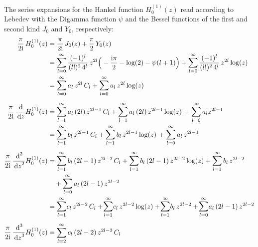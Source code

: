 \newpage
The series expansions for the Hankel function $H_0^{(1)}(z)$ read according to Lebedev \cite[Sec. 5.6]{lebedev} with the Digamma function $\psi$ and the Bessel functions of the first and second kind $J_0$ and $Y_0$, respectively:
\begin{align*}
  \frac{\pi}{2 \ii} \, H_0^{(1)}(z)
  &= \frac{\pi}{2\ii} \, J_0(z) + \frac{\pi}{2}\, Y_0(z) \\
  &= \mathlarger{\sum}_{l = 0}^\infty \, \frac{(-1)^l}{(l!)^2 \, 4^l} \,  z^{2l} \Big( -\frac{\ii \pi}{2} - \log(2) - \psi(l + 1) \Big) 
  +  \mathlarger{\sum}_{l = 0}^\infty \, \frac{(-1)^l}{(l!)^2 \, 4^l} \,  z^{2l} \log(z) \\
  &= \mathlarger{\sum}_{l = 0}^\infty \, a_l \,  z^{2l} \, C_l 
   + \mathlarger{\sum}_{l = 0}^\infty \, a_l  \,z^{2l} \log(z) \\[0.5em]
  \frac{\pi}{2\ii} \, \frac{\d{}}{\d z} H_0^{(1)}(z)
  &= \mathlarger{\sum}_{l = 1}^\infty \, a_l \,  (2l) \, z^{2l - 1} \, C_l 
  + \mathlarger{\sum}_{l = 1}^\infty \, a_l \, (2l)  \, z^{2l - 1} \log(z) \, 
  + \mathlarger{\sum}_{l = 0}^\infty \, a_l z^{2l - 1} \\
  &= \mathlarger{\sum}_{l = 1}^\infty \, b_l \, z^{2l - 1} \, C_l 
  + \mathlarger{\sum}_{l = 1}^\infty \, b_l \, z^{2l - 1} \log(z) \, 
  +  \mathlarger{\sum}_{l = 0}^\infty \, a_l \, z^{2l - 1} \\[0.5em]
  \frac{\pi}{2\ii} \, \frac{\d{}^2}{\d z^2} H_0^{(1)}(z)
  &= \mathlarger{\sum}_{l = 1}^\infty \, b_l \, (2l - 1) \, z^{2l - 2} \, C_l 
  + \mathlarger{\sum}_{l = 1}^\infty \, b_l \, (2l - 1)\, z^{2l - 2} \log(z) 
  + \mathlarger{\sum}_{l = 1}^\infty \, b_l \, z^{2l - 2}\\
  &\quad + \mathlarger{\sum}_{l = 0}^\infty \, a_l \, (2l - 1) \, z^{2l - 2} \\
  &=   \mathlarger{\sum}_{l = 1}^\infty c_l \, z^{2l - 2} \, C_l 
  +  \!\mathlarger{\sum}_{l = 1}^\infty c_l \, z^{2l - 2} \log(z) 
  +  \!\mathlarger{\sum}_{l = 1}^\infty b_l \, z^{2l - 2} 
  +  \!\mathlarger{\sum}_{l = 0}^\infty a_l \, (2l - 1) \, z^{2l - 2} \\[0.5em]
  \frac{\pi}{2\ii} \, \frac{\d{}^3}{\d z^3} H_0^{(1)}(z)
  &= \sum_{l = 2}^\infty c_l \, (2l - 2) \, z^{2l - 3} \, C_l 

\end{align*}
